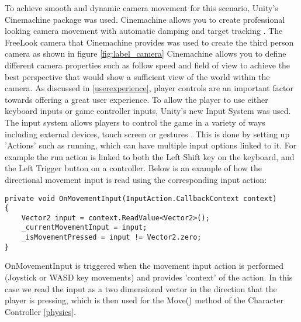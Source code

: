 \documentclass[10pt]{final_report}
\begin{document}
To achieve smooth and dynamic camera movement for this scenario, Unity's Cinemachine package was used. Cinemachine allows you to create professional looking camera movement with automatic damping and target tracking \cite{onewheelstudio_2021}. The FreeLook camera that Cinemachine provides was used to create the third person camera as shown in figure \ref{fig:label_camera}
Cinemachine allows you to define different camera properties such as follow speed and field of view to achieve the best perspective that would show a sufficient view of the world within the camera. \newline
As discussed in \ref{userexperience}, player controls are an important factor towards offering a great user experience. To allow the player to use either keyboard inputs or game controller inputs, Unity's new Input System was used. The input system allows players to control the game in a variety of ways including external devices, touch screen or gestures \cite{unity_2024_inputsystem}. This is done by setting up 'Actions' such as running, which can have multiple input options linked to it. For example the run action is linked to both the Left Shift key on the keyboard, and the Left Trigger button on a controller. Below is an example of how the directional movement input is read using the corresponding input action:
\begin{verbatim}
private void OnMovementInput(InputAction.CallbackContext context)
{
    Vector2 input = context.ReadValue<Vector2>();
    _currentMovementInput = input;
    _isMovementPressed = input != Vector2.zero;
}
\end{verbatim}
OnMovementInput is triggered when the movement input action is performed (Joystick or WASD key movements) and provides 'context' of the action. In this case we read the input as a two dimensional vector in the direction that the player is pressing, which is then used for the Move() method of the Character Controller \ref{physics}.  \newline
\end{document}

